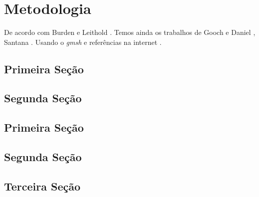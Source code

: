 \chapter{Metodologia}

\lipsum[1-2]


De acordo com Burden \cite{burden} e Leithold \cite{leithold}. 
Temos ainda os trabalhos de Gooch e Daniel \cite{gooch,daniel}, 
Santana \cite{santana}. Usando o \emph{gmsh} \cite{gmsh} e 
referências na internet \cite{wiki:quadrature}.

\section{Primeira Seção}

\lipsum[3-4]


\section{Segunda Seção}

\lipsum[5-6]


\section{Primeira Seção}

\lipsum[3-4]


\section{Segunda Seção}

\lipsum[5-6]


\section{Terceira Seção}

